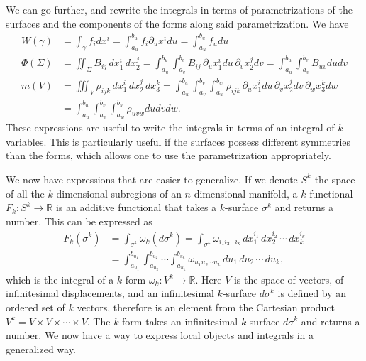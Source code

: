 We can go further, and rewrite the integrals in terms of parametrizations of the surfaces and the components of the forms along said parametrization. We have
\begin{equation}
	\begin{aligned}
		W(\gamma) &= \int_\gamma f_i dx^i = \int_{a_u}^{b_u} f_i \partial_u x^i du = \int_{a_u}^{b_u} f_u du \\
		\Phi(\Sigma) &= \iint_\Sigma B_{ij} \, dx_1^i \, dx_2^j = \int_{a_u}^{b_u} \int_{a_v}^{b_v} B_{ij} \, \partial_u x_1^i du \, \partial_v x_2^j dv = \int_{a_u}^{b_u} \int_{a_v}^{b_v} B_{uv} du dv \\
		m(V) &= \iiint_V \rho_{ijk} \, dx_1^i \, dx_2^j \, dx_3^k = \int_{a_u}^{b_u} \int_{a_v}^{b_v} \int_{a_w}^{b_w} \rho_{ijk} \,  \partial_u x_1^i du \, \partial_v x_2^j dv \, \partial_w x_3^k dw \\
		&= \int_{a_u}^{b_u} \int_{a_v}^{b_v} \int_{a_w}^{b_w} \rho_{uvw} du dv dw.
	\end{aligned}
\end{equation}
These expressions are useful to write the integrals in terms of an integral of $k$ variables. This is particularly useful if the surfaces possess different symmetries than the forms, which allows one to use the parametrization appropriately.

We now have expressions that are easier to generalize. If we denote $S^k$ the space of all the $k$-dimensional subregions of an $n$-dimensional manifold, a $k$-functional $F_k : S^k \to \mathbb{R}$ is an additive functional that takes a $k$-surface $\sigma^k$ and returns a number. This can be expressed as
\begin{equation}
	\begin{aligned}
		F_k(\sigma^k) &= \int_{\sigma^k} \omega_k (d\sigma^k) = \int_{\sigma^k} \omega_{i_1 i_2 \cdots i_k} \, dx_1^{i_1} \, dx_2^{i_2} \, \cdots \, dx_k^{i_k} \\
		&= \int_{a_{u_1}}^{b_{u_1}} \int_{a_{u_2}}^{b_{u_2}} \cdots \int_{a_{u_k}}^{b_{u_k}} \omega_{u_1 u_2 \cdots u_k} \, du_1 \, du_2 \, \cdots \, du_k,
	\end{aligned}
\end{equation}
which is the integral of a $k$-form $\omega_k : V^k \to \mathbb{R}$. Here $V$ is the space of vectors, of infinitesimal displacements, and an infinitesimal $k$-surface $d\sigma^k$ is defined by an ordered set of $k$ vectors, therefore is an element from the Cartesian product $V^k = V \times V \times \cdots \times V$. The $k$-form takes an infinitesimal $k$-surface $d\sigma^k$ and returns a number. We now have a way to express local objects and integrals in a generalized way.

